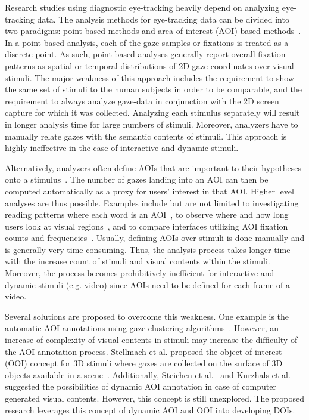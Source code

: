 Research studies using diagnostic eye-tracking heavily depend on analyzing eye-tracking data. The analysis methods for eye-tracking data can be divided into two paradigms: point-based methods and area of interest (AOI)-based methods~\cite{Bla14}. In a point-based analysis, each of the gaze samples or fixations is treated as a discrete point. As such, point-based analyses generally report overall fixation patterns as spatial or temporal distributions of 2D gaze coordinates over visual stimuli. The major weakness of this approach includes the requirement to show the same set of stimuli to the human subjects in order to be comparable, and the requirement to always analyze gaze-data in conjunction with the 2D screen capture for which it was collected. Analyzing each stimulus separately will result in longer analysis time for large numbers of stimuli. Moreover, analyzers have to manually relate gazes with the semantic contents of stimuli. This approach is highly ineffective in the case of interactive and dynamic stimuli. 

Alternatively, analyzers often define AOIs that are important to their hypotheses onto a stimulus~\cite{Bla14}. The number of gazes landing into an AOI can then be computed automatically as a proxy for users' interest in that AOI. Higher level analyses are thus possible. Examples include but are not limited to investigating reading patterns where each word is an AOI~\cite{Bey05, SR08}, to observe where and how long users look at visual regions~\cite{Coco09, Kim12}, and to compare interfaces utilizing AOI fixation counts and frequencies~\cite{Coletkin09}. Usually, defining AOIs over stimuli is done manually and is generally very time consuming. Thus, the analysis process takes longer time with the increase count of stimuli and visual contents within the stimuli. Moreover, the process becomes prohibitively inefficient for interactive and dynamic stimuli (e.g. video) since AOIs need to be defined for each frame of a video. 

Several solutions are proposed to overcome this weakness. One example is the automatic AOI annotations using gaze clustering algorithms~\cite{Pri00, San04, Dru14}. However, an increase of complexity of visual contents in stimuli may increase the difficulty of the AOI annotation process. Stellmach et al. proposed the object of interest (OOI) concept for 3D stimuli where gazes are collected on the surface of 3D objects available in a scene~\cite{Ste10}. Additionally, Steichen et al.~\cite{Ste13} and Kurzhals et al.~\cite{Kur14} suggested the possibilities of dynamic AOI annotation in case of computer generated visual contents. However, this concept is still unexplored. The proposed research leverages this concept of dynamic AOI and OOI into developing DOIs. 

